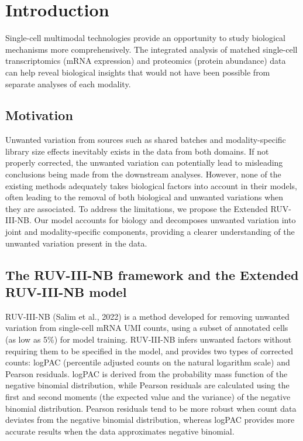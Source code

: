 \documentclass[]{article}
\author{Hsiao-Chi Liao}
\date{2024-10-09}
\begin{document}
\maketitle


{
\setcounter{tocdepth}{2}
\tableofcontents
\newpage
}
\section{Introduction}\label{introduction}

Single-cell multimodal technologies provide an opportunity to study biological mechanisms more comprehensively. The integrated analysis of matched single-cell transcriptomics (mRNA expression) and proteomics (protein abundance) data can help reveal biological insights that would not have been possible from separate analyses of each modality.

\subsection{Motivation}\label{motivation}

Unwanted variation from sources such as shared batches and modality-specific library size effects inevitably exists in the data from both domains. If not properly corrected, the unwanted variation can potentially lead to misleading conclusions being made from the downstream analyses. However, none of the existing methods adequately takes biological factors into account in their models, often leading to the removal of both biological and unwanted variations when they are associated. To address the limitations, we propose the Extended RUV-III-NB. Our model accounts for biology and decomposes unwanted variation into joint and modality-specific components, providing a clearer understanding of the unwanted variation present in the data.

\subsection{The RUV-III-NB framework and the Extended RUV-III-NB model}\label{the-ruv-iii-nb-framework-and-the-extended-ruv-iii-nb-model}

RUV-III-NB (Salim et al., 2022) is a method developed for removing unwanted variation from single-cell mRNA UMI counts, using a subset of annotated cells (as low as 5\%) for model training. RUV-III-NB infers unwanted factors without requiring them to be specified in the model, and provides two types of corrected counts: logPAC (percentile adjusted counts on the natural logarithm scale) and Pearson residuals. logPAC is derived from the probability mass function of the negative binomial distribution, while Pearson residuals are calculated using the first and second moments (the expected value and the variance) of the negative binomial distribution. Pearson residuals tend to be more robust when count data deviates from the negative binomial distribution, whereas logPAC provides more accurate results when the data approximates negative binomial.
\end{document}
